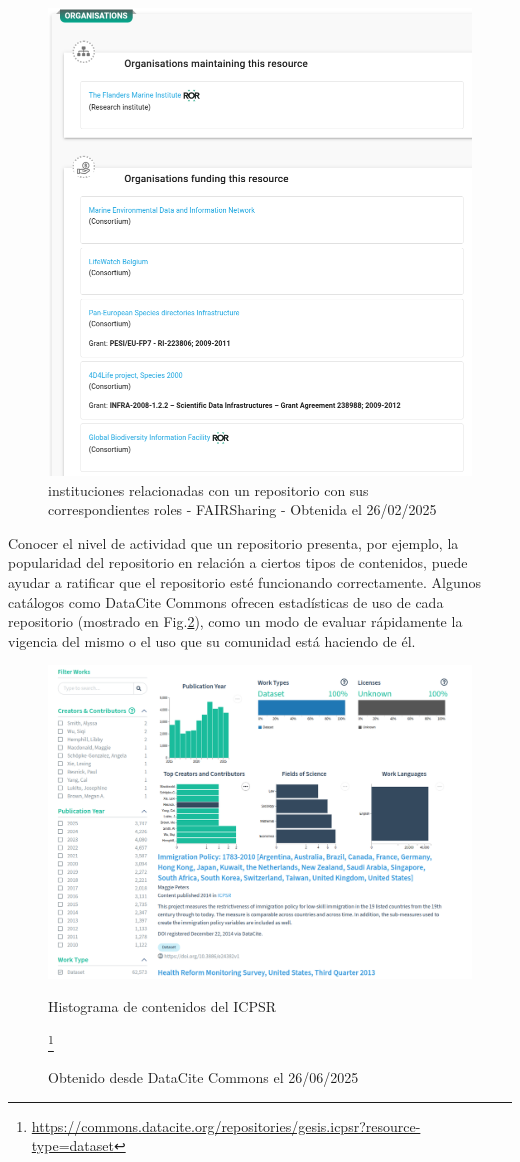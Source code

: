 \documentclass[runningheads]{llncs}
\begin{document}

\begin{figure}
    \centering
    \includegraphics[width=0.5\linewidth]{img/fairsharing_institutions.png}
    \caption{instituciones relacionadas con un repositorio con sus correspondientes roles - FAIRSharing - Obtenida el 26/02/2025}
    \label{fig:fairsharing_institutions}
\end{figure}

Conocer el nivel de actividad que un repositorio presenta,  por ejemplo, la popularidad del repositorio en relación a ciertos tipos de contenidos, puede ayudar a ratificar que el repositorio esté funcionando correctamente. Algunos catálogos como DataCite Commons ofrecen estadísticas de uso de cada repositorio (mostrado en Fig.\ref{fig:datacite_commons_histograma}), como un modo de evaluar rápidamente la vigencia del mismo o el uso que su comunidad está haciendo de él.\\

\begin{figure}
    \centering
    \includegraphics[width=0.5\linewidth]{img/datacite_commons_histograma.png}
    \caption{Histograma de contenidos del ICPSR} 
    \footnote{\url{https://commons.datacite.org/repositories/gesis.icpsr?resource-type=dataset}}
    \caption{Obtenido desde DataCite Commons el 26/06/2025}
    \label{fig:datacite_commons_histograma}
\end{figure}
\end{document}
